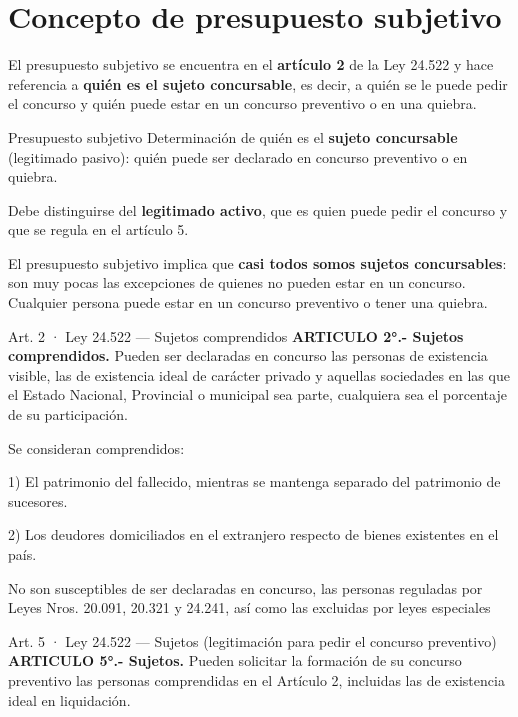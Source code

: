 \documentclass[12pt,oneside]{book}
\begin{document}
\section{Concepto de presupuesto subjetivo}

El presupuesto subjetivo se encuentra en el \textbf{artículo 2} de la Ley 24.522 y hace referencia a \textbf{quién es el sujeto concursable}, es decir, a quién se le puede pedir el concurso y quién puede estar en un concurso preventivo o en una quiebra.

\begin{definition}{Presupuesto subjetivo}
Determinación de quién es el \textbf{sujeto concursable} (legitimado pasivo): quién puede ser declarado en concurso preventivo o en quiebra.
\end{definition}

Debe distinguirse del \textbf{legitimado activo}, que es quien puede pedir el concurso y que se regula en el artículo 5.

\begin{important}
El presupuesto subjetivo implica que \textbf{casi todos somos sujetos concursables}: son muy pocas las excepciones de quienes no pueden estar en un concurso. Cualquier persona puede estar en un concurso preventivo o tener una quiebra.
\end{important}

\begin{norma}{Art. 2 · Ley 24.522 — Sujetos comprendidos}
\textbf{ARTICULO 2°.- Sujetos comprendidos.} Pueden ser declaradas en concurso las personas de existencia visible, las de existencia ideal de carácter privado y aquellas sociedades en las que el Estado Nacional, Provincial o municipal sea parte, cualquiera sea el porcentaje de su participación.

Se consideran comprendidos:

1) El patrimonio del fallecido, mientras se mantenga separado del patrimonio de sucesores.

2) Los deudores domiciliados en el extranjero respecto de bienes existentes en el país.

No son susceptibles de ser declaradas en concurso, las personas reguladas por Leyes Nros. 20.091, 20.321 y 24.241, así como las excluidas por leyes especiales
\end{norma}

\begin{norma}{Art. 5 · Ley 24.522 — Sujetos (legitimación para pedir el concurso preventivo)}
\textbf{ARTICULO 5°.- Sujetos.} Pueden solicitar la formación de su concurso preventivo las personas comprendidas en el Artículo 2, incluidas las de existencia ideal en liquidación.
\end{norma}
\end{document}
